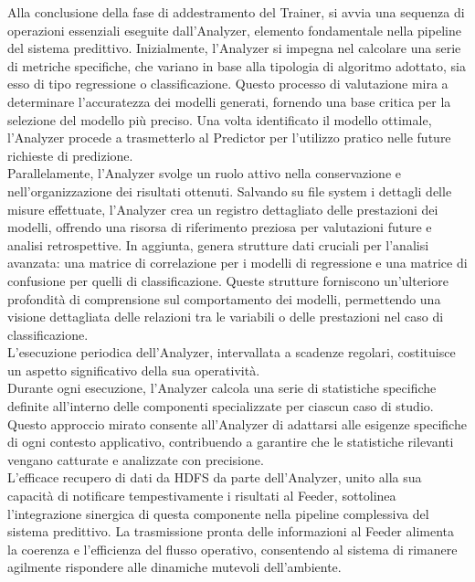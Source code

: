 Alla conclusione della fase di addestramento del Trainer, si avvia una sequenza di operazioni essenziali eseguite dall'Analyzer, elemento fondamentale nella pipeline del sistema predittivo.
Inizialmente, l'Analyzer si impegna nel calcolare una serie di metriche specifiche, che variano in base alla tipologia di algoritmo adottato, sia esso di tipo regressione o classificazione.
Questo processo di valutazione mira a determinare l'accuratezza dei modelli generati, fornendo una base critica per la selezione del modello più preciso.
Una volta identificato il modello ottimale, l'Analyzer procede a trasmetterlo al Predictor per l'utilizzo pratico nelle future richieste di predizione. \\
Parallelamente, l'Analyzer svolge un ruolo attivo nella conservazione e nell'organizzazione dei risultati ottenuti.
Salvando su file system i dettagli delle misure effettuate, l'Analyzer crea un registro dettagliato delle prestazioni dei modelli, offrendo una risorsa di riferimento preziosa per valutazioni future e analisi retrospettive.
In aggiunta, genera strutture dati cruciali per l'analisi avanzata: una matrice di correlazione per i modelli di regressione e una matrice di confusione per quelli di classificazione.
Queste strutture forniscono un'ulteriore profondità di comprensione sul comportamento dei modelli, permettendo una visione dettagliata delle relazioni tra le variabili o delle prestazioni nel caso di classificazione. \\
L'esecuzione periodica dell'Analyzer, intervallata a scadenze regolari, costituisce un aspetto significativo della sua operatività. \\
Durante ogni esecuzione, l'Analyzer calcola una serie di statistiche specifiche definite all'interno delle componenti specializzate per ciascun caso di studio.
Questo approccio mirato consente all'Analyzer di adattarsi alle esigenze specifiche di ogni contesto applicativo, contribuendo a garantire che le statistiche rilevanti vengano catturate e analizzate con precisione. \\
L'efficace recupero di dati da HDFS da parte dell'Analyzer, unito alla sua capacità di notificare tempestivamente i risultati al Feeder, sottolinea l'integrazione sinergica di questa componente nella pipeline complessiva del sistema predittivo.
La trasmissione pronta delle informazioni al Feeder alimenta la coerenza e l'efficienza del flusso operativo, consentendo al sistema di rimanere agilmente rispondere alle dinamiche mutevoli dell'ambiente. 


